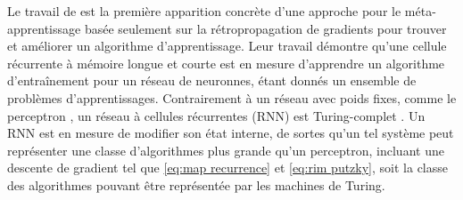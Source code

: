 
Le travail de \citet{Younger2001} est la première apparition concrète d'une approche pour le méta-apprentissage 
basée seulement sur la rétropropagation de gradients 
pour trouver et améliorer un algorithme d'apprentissage.
Leur travail démontre qu'une cellule récurrente à mémoire longue et courte \citep[LSTM,][]{Hochreiter1997} est en mesure d'apprendre 
un algorithme d'entraînement pour un réseau de neuronnes, étant donnés un ensemble de problèmes d'apprentissages. 
Contrairement à un réseau avec poids fixes, comme le perceptron \citep{Rosenblatt1958}, 
un réseau à cellules récurrentes (RNN) est Turing-complet \citep{Siegelmann1992}.
Un RNN est en mesure de modifier son état interne, de sortes qu'un tel système peut représenter une classe d'algorithmes plus grande qu'un perceptron, 
incluant une descente de gradient tel que \eqref{eq:map recurrence} et \eqref{eq:rim putzky}, 
soit la classe des algorithmes pouvant être représentée par les machines de Turing.

